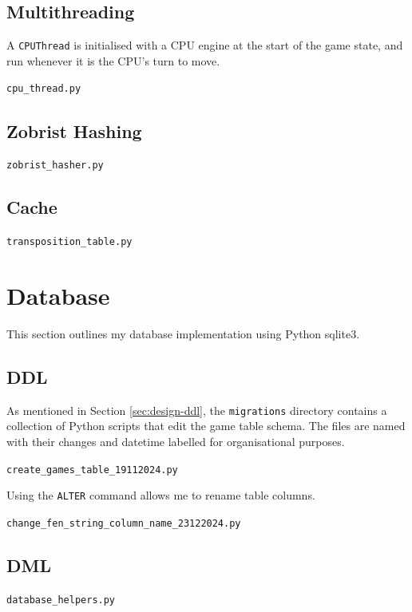 \documentclass[../main/main.tex]{subfiles}
\begin{document}
\subsection{Multithreading}
A \lstinline{CPUThread} is initialised with a CPU engine at the start of the game state, and run whenever it is the CPU's turn to move.

\noindent\verb|cpu_thread.py|
\label{sec:cpu-thread}


\subsection{Zobrist Hashing}
\label{sec:zobrist-hashing}
\noindent\verb|zobrist_hasher.py|


\subsection{Cache}
\noindent\verb|transposition_table.py|


\section{Database}
This section outlines my database implementation using Python sqlite3.

\subsection{DDL}
As mentioned in Section \ref{sec:design-ddl}, the \lstinline{migrations} directory contains a collection of Python scripts that edit the game table schema. The files are named with their changes and datetime labelled for organisational purposes.

\noindent\verb|create_games_table_19112024.py|

Using the \lstinline{ALTER} command allows me to rename table columns.

\bigskip
\noindent\verb|change_fen_string_column_name_23122024.py|


\subsection{DML}
\noindent\verb|database_helpers.py|

\end{document}
